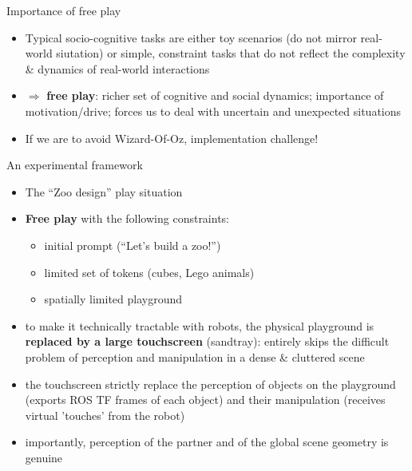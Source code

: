 \documentclass[compress]{beamer}
\begin{document}
\begin{frame}{Importance of free play}

    \begin{itemize}
        \item<1-> Typical socio-cognitive tasks are either toy scenarios (\ie do not mirror
            real-world siutation) or simple, constraint tasks that do not
            reflect the complexity \& dynamics of real-world interactions
        \item<2-> $\Rightarrow$ {\bf free play}: richer set of cognitive and
            social dynamics; importance of motivation/drive; forces us to deal
            with uncertain and unexpected situations
        \item<3-> If we are to avoid Wizard-Of-Oz, implementation challenge!
    \end{itemize}
\end{frame}


\begin{frame}{An experimental framework}

    \begin{itemize}
        \item The ``Zoo design'' play situation
        \item {\bf Free play} with the following constraints:
            \begin{itemize}
                \item initial prompt (``Let's build a zoo!'')
                \item limited set of tokens (cubes, Lego animals)
                \item spatially limited playground
            \end{itemize}
        \item<2-> to make it technically tractable with robots, the physical
            playground is {\bf replaced by a large touchscreen} (sandtray): entirely
            skips the difficult problem of perception and manipulation in a
            dense \& cluttered scene
        \item<2-> the touchscreen strictly
            replace the perception of objects on the playground (exports
            ROS TF frames of each object) and their manipulation (receives
            virtual 'touches' from the robot)
        \item<2-> importantly, perception of the partner and of the global scene
            geometry is genuine
    \end{itemize}
\end{frame}
\end{document}
